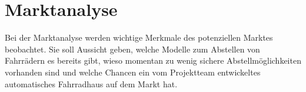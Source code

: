 \section{Marktanalyse}
Bei der Marktanalyse werden wichtige Merkmale des potenziellen Marktes beobachtet. Sie soll Aussicht geben, welche Modelle zum Abstellen von Fahrrädern es bereits gibt, wieso momentan zu wenig sichere Abstellmöglichkeiten vorhanden sind und welche Chancen ein vom Projektteam entwickeltes automatisches Fahrradhaus auf dem Markt hat.













\clearpage

